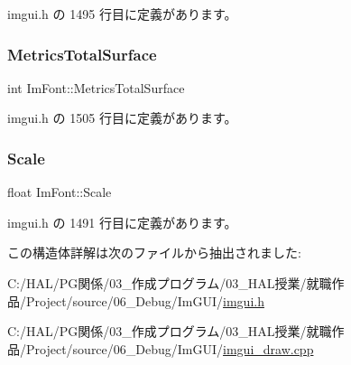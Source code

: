  imgui.\+h の 1495 行目に定義があります。

\mbox{\label{struct_im_font_a8087b2ee8b27dcf5c6e30a8318f87cc7}} 
\subsubsection{\texorpdfstring{Metrics\+Total\+Surface}{MetricsTotalSurface}}
{\footnotesize\ttfamily int Im\+Font\+::\+Metrics\+Total\+Surface}



 imgui.\+h の 1505 行目に定義があります。

\mbox{\label{struct_im_font_ae98fb07fd8862a7243d77b11f38bba19}} 
\subsubsection{\texorpdfstring{Scale}{Scale}}
{\footnotesize\ttfamily float Im\+Font\+::\+Scale}



 imgui.\+h の 1491 行目に定義があります。



この構造体詳解は次のファイルから抽出されました\+:\begin{DoxyCompactItemize}
\item 
C\+:/\+H\+A\+L/\+P\+G関係/03\+\_\+作成プログラム/03\+\_\+\+H\+A\+L授業/就職作品/\+Project/source/06\+\_\+\+Debug/\+Im\+G\+U\+I/\mbox{\hyperlink{imgui_8h}{imgui.\+h}}\item 
C\+:/\+H\+A\+L/\+P\+G関係/03\+\_\+作成プログラム/03\+\_\+\+H\+A\+L授業/就職作品/\+Project/source/06\+\_\+\+Debug/\+Im\+G\+U\+I/\mbox{\hyperlink{imgui__draw_8cpp}{imgui\+\_\+draw.\+cpp}}\end{DoxyCompactItemize}
